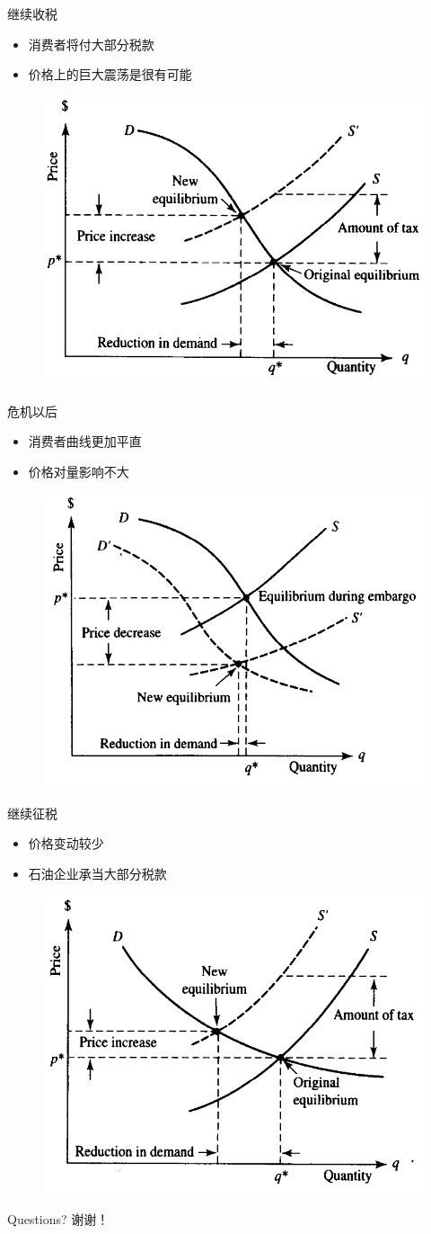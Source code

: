 \documentclass[UTF8]{ctexbeamer}
\begin{document}
\begin{frame}{继续收税}
  \begin{itemize}
  \item 消费者将付大部分税款
  \item 价格上的巨大震荡是很有可能
  \end{itemize}

  \begin{figure}
    \centering
    \includegraphics[width=.5\textwidth]{poor.png}
  \end{figure}
  
\end{frame}

\begin{frame}{危机以后}
  \begin{itemize}
  \item 消费者曲线更加平直
  \item 价格对量影响不大
  \end{itemize}

  \begin{figure}
    \centering
    \includegraphics[width=.5\textwidth]{ac.png}
  \end{figure}
  
\end{frame}

\begin{frame}{继续征税}
  \begin{itemize}
  \item 价格变动较少
  \item 石油企业承当大部分税款
  \end{itemize}

  \begin{figure}
    \centering
    \includegraphics[width=.5\textwidth]{crazy.png}
  \end{figure}

\end{frame}

\begin{frame}
  Questions?
  谢谢！
\end{frame}
\end{document}

